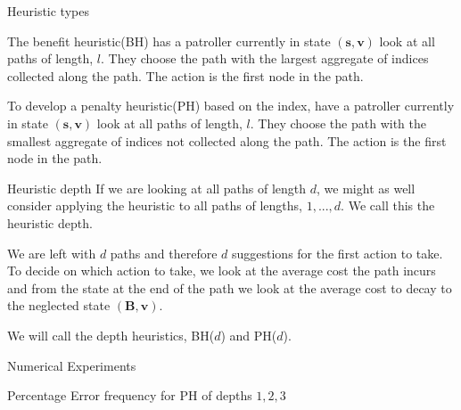 \documentclass[10pt]{beamer}
\begin{document}
\begin{frame}{Heuristic types}
\begin{definition}
The benefit heuristic(BH) has a patroller currently in state $(\bm{s},\bm{v})$ look at all paths of length, $l$. They choose the path with the largest aggregate of indices collected along the path. The action is the first node in the path.
\end{definition}

\begin{definition}
To develop a penalty heuristic(PH) based on the index, have a patroller currently in state $(\bm{s},\bm{v})$ look at all paths of length, $l$. They choose the path with the smallest aggregate of indices not collected along the path. The action is the first node in the path.
\end{definition}

\end{frame}

\begin{frame}{Heuristic depth}
If we are looking at all paths of length $d$, we might as well consider applying the heuristic to all paths of lengths, $1,...,d$. We call this the heuristic depth.

We are left with $d$ paths and therefore $d$ suggestions for the first action to take. To decide on which action to take, we look at the average cost the path incurs and from the state at the end of the path we look at the average cost to decay to the neglected state $(\bm{B},\bm{v})$.

We will call the depth heuristics, BH($d$) and PH($d$).

\end{frame}

\begin{frame}{Numerical Experiments}

\begin{myfigure}[H]
\begin{center}
\resizebox{\linewidth}{!}{

}
\end{center}
\caption{Percentage Error frequency for PH of depths $1,2,3$}
\end{myfigure}

\end{frame}
\end{document}

